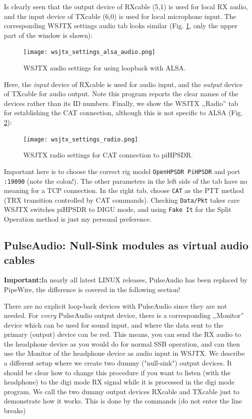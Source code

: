 \documentclass[12pt]{book}
\def\rett#1{\texttt{\color{red}#1}}
\def\pH{pi\-HPSDR\xspace}
\begin{document}
Is clearly seen that the output device of RXcable (5,1) is used for local RX audio, and the input
device of TXcable (6,0) is used for local microphone input. The corresponding WSJTX settings audio
tab looks similar (Fig. \ref{fig:wsjtx_settings_alsa_audio}, only the upper part of the
window is shown):

\begin{figure}[ht]
\center
\texttt{[image: wsjtx\_settings\_alsa\_audio.png]}
\caption{WSJTX audio settings for using loopback with ALSA.}
\label{fig:wsjtx_settings_alsa_audio}
\end{figure}

Here, the \textit{input} device of RXcable is used for audio input, and the
\textit{output} device of TXcable for audio output. Note this program reports the
clear names of the devices rather than its ID numbers. Finally, we show the WSJTX ,,Radio''
tab for establishing the CAT connection, although this is not specific to ALSA
(Fig. \ref{fig:wsjtx_settings_radio}):

\begin{figure}[ht]
\center
\texttt{[image: wsjtx\_settings\_radio.png]}
\caption{WSJTX radio settings for CAT connection to \pH.}
\label{fig:wsjtx_settings_radio}
\end{figure}

Important here is to choose the correct rig model \rett{OpenHPSDR PiHPSDR} and
port \rett{:19090} (note the colon!). The other parameters in the left side of the tab
have no meaning for a TCP connection. In the right tab, choose \rett{CAT} as
the PTT method (TRX transition controlled by CAT commands). Checking \rett{Data/Pkt}
takes care WSJTX switches \pH to DIGU mode, and using \rett{Fake It} for the Split
Operation method is just my personal preference.

\subsection[PulseAudio: NullSink modules]{PulseAudio: Null-Sink modules as virtual audio cables}

\textbf{Important:}In nearly all latest LINUX releases, PulseAudio has been replaced by
PipeWire, the difference is covered in the following section!

There are no explicit loop-back devices with PulseAudio since they are not needed.
For \textit{every} PulseAudio output device, there is a corresponding ,,Monitor'' device
which can be used for sound input, and where the data sent to the primary (output) device
can be red. This means, you can send the RX audio to the headphone device as you would do
for normal SSB operation, and can then use the Monitor of the headphone device as audio
input in WSJTX. We describe a different setup where we create two dummy
 ("null-sink") output devices. It should be clear how to change this procedure if
 you want to listen (with the headphone) to the digi mode RX signal while it is processed
 in the digi mode program.  We call the two dummy output devices
 RXcable and TXcable just to demonstrate how it works.
  This is done by the commands (do not enter the line breaks)
\end{document}
